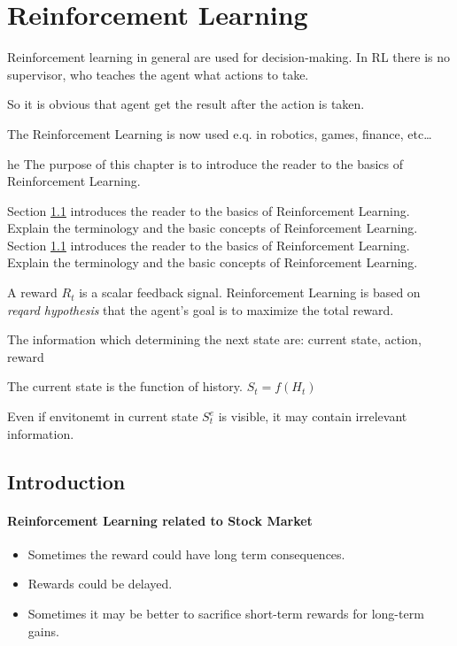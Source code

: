 

\chapter{Reinforcement Learning}\label{ch:reinforcement-learning}
Reinforcement learning in general are used for decision-making.
In RL there is no supervisor, who teaches the agent what actions to take.

So it is obvious that agent get the result after the action is taken.

The Reinforcement Learning is now used e.q. in robotics, games, finance, etc\ldots

he
The purpose of this chapter is to introduce the reader to the basics of Reinforcement Learning.

Section \ref{sec:rl-introduction} introduces the reader to the basics of Reinforcement Learning.
Explain the terminology and the basic concepts of Reinforcement Learning.
Section \ref{sec:rl-introduction} introduces the reader to the basics of Reinforcement Learning.
Explain the terminology and the basic concepts of Reinforcement Learning.

A reward $R_t$ is a scalar feedback signal.
Reinforcement Learning is based on \textit{reqard hypothesis} that the agent's goal is to maximize the total reward.

The information which determining the next state are: current state, action, reward

The current state is the function of history.
$S_t = f(H_t)$

Even if envitonemt in current state $S_{t}^{e}$ is visible, it may contain irrelevant information.


\section{Introduction}\label{sec:rl-introduction}

\subsubsection{Reinforcement Learning related to Stock Market}\label{subsec:rl-introduction}
\begin{itemize}
    \item Sometimes the reward could have long term consequences.
    \item Rewards could be delayed.
    \item Sometimes it may be better to sacrifice short-term rewards for long-term gains.
\end{itemize}

